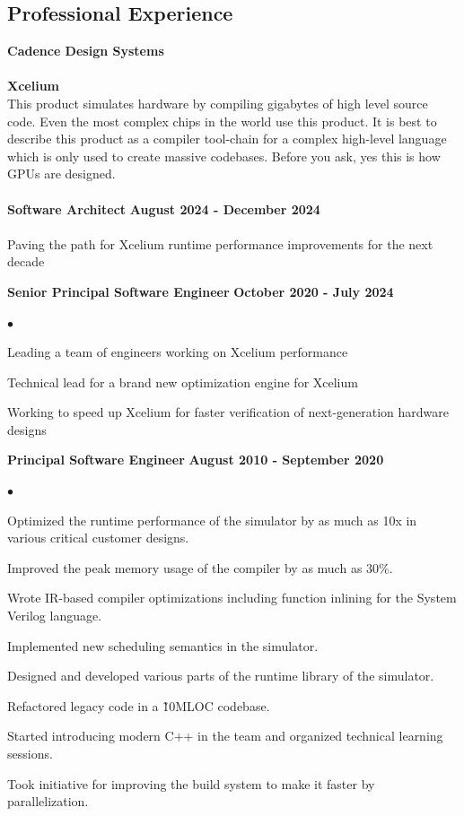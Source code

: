 \documentclass[margin,line]{res}
\newenvironment{list1}{
  \begin{list}{$\bullet$}{%
      \setlength{\itemsep}{0in}
      \setlength{\parsep}{0in} \setlength{\parskip}{0in}
      \setlength{\topsep}{0in} \setlength{\partopsep}{0in}
      \setlength{\leftmargin}{0.17in}}}{\end{list}}
\begin{document}
\begin{resume}
\section{\sc Professional Experience}
{\bf   Cadence Design Systems} \\ \\
{\bf Xcelium} \\
This product simulates hardware by compiling gigabytes of high level source code. Even the most complex chips in the world use this product. It is best to describe this product as a compiler tool-chain
for a complex high-level language which is only used to create massive codebases. Before you ask, yes this is how GPUs are designed. \\ \\
{\bf Software Architect}
\hfill{\bf August 2024 - December 2024} \\ \\
Paving the path for Xcelium runtime performance improvements for the next decade

{\bf Senior Principal Software Engineer}
\hfill{\bf October 2020 - July 2024} \\
\begin{list1} %
    \item Leading a team of engineers working on Xcelium performance
    \item Technical lead for a brand new optimization engine for Xcelium
    \item Working to speed up Xcelium for faster verification of next-generation hardware designs
\end{list1}

{\bf Principal Software Engineer}
\hfill{\bf August 2010 - September 2020} \\
\begin{list1} %
		\item Optimized the runtime performance of the simulator by as much as 10x in various critical customer designs.
		\item Improved the peak memory usage of the compiler by as much as 30\%.
		\item Wrote IR-based compiler optimizations including function inlining for the System Verilog language.
		\item Implemented new scheduling semantics in the simulator.
		\item Designed and developed various parts of the runtime library of the simulator.
		\item Refactored legacy code in a \~10MLOC codebase.
   		\item Started introducing modern C++ in the team and organized technical learning sessions.
   		\item Took initiative for improving the build system to make it faster by parallelization.
\end{list1}


\end{resume}
\end{document}
